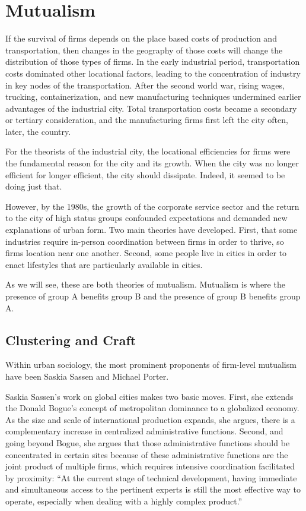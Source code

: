 \section*{Mutualism}
If the survival of firms depends on the place based costs of
production and transportation, then changes in the geography of those
costs will change the distribution of those types of firms. In the
early industrial period, transportation costs dominated other
locational factors, leading to the concentration of industry in key
nodes of the transportation. After the second world war, rising wages,
trucking, containerization, and new manufacturing techniques
undermined earlier advantages of the industrial city. Total
transportation costs became a secondary or tertiary consideration, and
the manufacturing firms first left the city often, later, the country.

For the theorists of the industrial city, the locational efficiencies
for firms were the fundamental reason for the city and its
growth. When the city was no longer efficient for longer efficient,
the city should dissipate. Indeed, it seemed to be doing just that. 

However, by the 1980s, the growth of the corporate service sector and
the return to the city of high status groups confounded expectations
and demanded new explanations of urban form. Two main theories have
developed. First, that some industries require in-person coordination
between firms in order to thrive, so firms location near one
another. Second, some people live in cities in order to enact
lifestyles that are particularly available in cities. 

As we will see, these are both theories of mutualism. Mutualism is
where the presence of group A benefits group B and the presence of
group B benefits group A. 

\subsection*{Clustering and Craft}
Within urban sociology, the most prominent proponents of firm-level
mutualism have been Saskia Sassen and Michael Porter.

Saskia Sassen's work on global cities makes two basic moves. First,
she extends the Donald Bogue's concept of metropolitan dominance to a
globalized economy.\cite{bogue_structure_1988} As the size and scale of international
production expands, she argues, there is a complementary increase in
centralized administrative functions. Second, and going beyond Bogue,
she argues that those administrative functions should be concentrated
in certain sites because of these administrative functions are the
joint product of multiple firms, which requires intensive coordination
facilitated by proximity: ``At the current stage of technical
development, having immediate and simultaneous access to the pertinent
experts is still the most effective way to operate, especially when
dealing with a highly complex product.''\cite{sassen_cities_2011}

